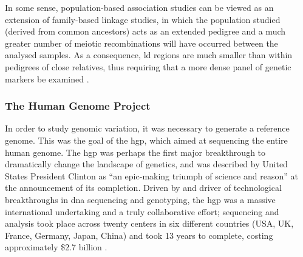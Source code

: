 In some sense, population-based association studies can be viewed as an extension of family-based linkage studies, in which the population studied (derived from common ancestors) acts as an extended pedigree and a much greater number of meiotic recombinations will have occurred between the analysed samples.
As a consequence, \gls{ld} regions are much smaller than within pedigrees of close relatives, thus requiring that a more dense panel of genetic markers be examined \cite{cordell2005genetic}.

\subsubsection{The Human Genome Project}
\label{sec:hgp}

In order to study genomic variation, it was necessary to generate a reference genome.
This was the goal of the \gls{hgp}, which aimed at sequencing the entire human genome.
The \gls{hgp} was perhaps the first major breakthrough to dramatically change the landscape of genetics, and was described by United States President Clinton as “an epic-making triumph of science and reason” \cite{clinton2000remarks} at the announcement of its completion.
Driven by and driver of technological breakthroughs in \gls{dna} sequencing and genotyping, the \gls{hgp} was a massive international undertaking and a truly collaborative effort; sequencing and analysis took place across twenty centers in six different countries (USA, UK, France, Germany, Japan, China) and took 13 years to complete, costing approximately \$2.7 billion \cite{lander2011initial}.
